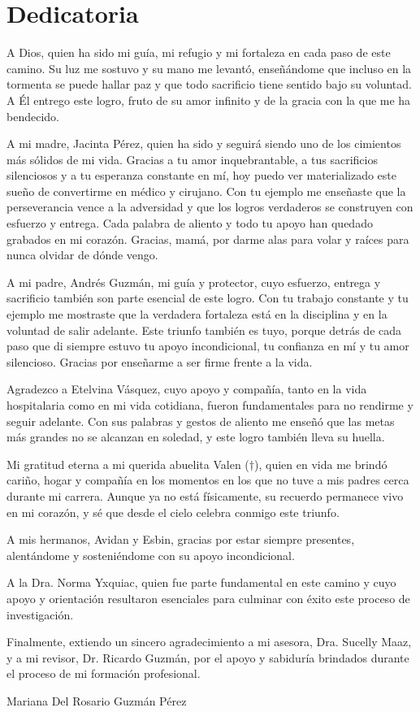 \chapter*{Dedicatoria}

A Dios, quien ha sido mi guía, mi refugio y mi fortaleza en cada paso de este 
camino. Su luz me sostuvo y su mano me levantó, enseñándome que incluso en la 
tormenta se puede hallar paz y que todo sacrificio tiene sentido bajo su 
voluntad. A Él entrego este logro, fruto de su amor infinito y de la gracia 
con la que me ha bendecido.

A mi madre, Jacinta Pérez, quien ha sido y seguirá siendo uno de los cimientos 
más sólidos de mi vida. Gracias a tu amor inquebrantable, a tus sacrificios 
silenciosos y a tu esperanza constante en mí, hoy puedo ver materializado este 
sueño de convertirme en médico y cirujano. Con tu ejemplo me enseñaste que la 
perseverancia vence a la adversidad y que los logros verdaderos se construyen 
con esfuerzo y entrega. Cada palabra de aliento y todo tu apoyo han quedado 
grabados en mi corazón. Gracias, mamá, por darme alas para volar y raíces 
para nunca olvidar de dónde vengo.

A mi padre, Andrés Guzmán, mi guía y protector, cuyo esfuerzo, entrega y 
sacrificio también son parte esencial de este logro. Con tu trabajo constante 
y tu ejemplo me mostraste que la verdadera fortaleza está en la disciplina y 
en la voluntad de salir adelante. Este triunfo también es tuyo, porque detrás 
de cada paso que di siempre estuvo tu apoyo incondicional, tu confianza en mí 
y tu amor silencioso. Gracias por enseñarme a ser firme frente a la vida.

Agradezco a Etelvina Vásquez, cuyo apoyo y compañía, tanto en la vida 
hospitalaria como en mi vida cotidiana, fueron fundamentales para no rendirme 
y seguir adelante. Con sus palabras y gestos de aliento me enseñó que las 
metas más grandes no se alcanzan en soledad, y este logro también lleva su 
huella.

Mi gratitud eterna a mi querida abuelita Valen ($\dagger$), quien en vida me 
brindó cariño, hogar y compañía en los momentos en los que no tuve a mis padres 
cerca durante mi carrera. Aunque ya no está físicamente, su recuerdo permanece 
vivo en mi corazón, y sé que desde el cielo celebra conmigo este triunfo.

A mis hermanos, Avidan y Esbin, gracias por estar siempre presentes, 
alentándome y sosteniéndome con su apoyo incondicional.

A la Dra. Norma Yxquiac, quien fue parte fundamental en este camino y cuyo 
apoyo y orientación resultaron esenciales para culminar con éxito este proceso 
de investigación.

Finalmente, extiendo un sincero agradecimiento a mi asesora, Dra. Sucelly Maaz, 
y a mi revisor, Dr. Ricardo Guzmán, por el apoyo y sabiduría brindados durante 
el proceso de mi formación profesional.

\begin{flushright}
Mariana Del Rosario Guzmán Pérez
\end{flushright}
